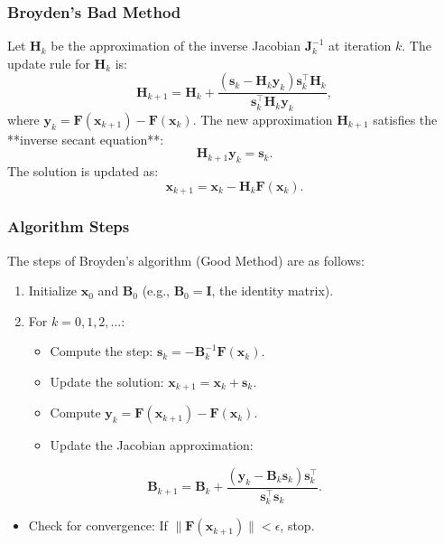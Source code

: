 \documentclass{beamer}
\begin{document}
\begin{frame}
\frametitle{Broyden’s Bad Method}

Let \( \mathbf{H}_k \) be the approximation of the inverse Jacobian \( \mathbf{J}_k^{-1} \) at iteration \( k \). The update rule for \( \mathbf{H}_k \) is:
\[
\mathbf{H}_{k+1} = \mathbf{H}_k + \frac{(\mathbf{s}_k - \mathbf{H}_k \mathbf{y}_k) \mathbf{s}_k^\top \mathbf{H}_k}{\mathbf{s}_k^\top \mathbf{H}_k \mathbf{y}_k},
\]
where \( \mathbf{y}_k = \mathbf{F}(\mathbf{x}_{k+1}) - \mathbf{F}(\mathbf{x}_k) \). The new approximation \( \mathbf{H}_{k+1} \) satisfies the **inverse secant equation**:
\[
\mathbf{H}_{k+1} \mathbf{y}_k = \mathbf{s}_k.
\]
The solution is updated as:
\[
\mathbf{x}_{k+1} = \mathbf{x}_k - \mathbf{H}_k \mathbf{F}(\mathbf{x}_k).
\]
\end{frame}

\begin{frame}
\frametitle{Algorithm Steps}

The steps of Broyden’s algorithm (Good Method) are as follows:
\begin{enumerate}
\item Initialize \( \mathbf{x}_0 \) and \( \mathbf{B}_0 \) (e.g., \( \mathbf{B}_0 = \mathbf{I} \), the identity matrix).

\item For \( k = 0, 1, 2, \dots \):
\begin{itemize}

  \item Compute the step: \( \mathbf{s}_k = -\mathbf{B}_k^{-1} \mathbf{F}(\mathbf{x}_k) \).

  \item Update the solution: \( \mathbf{x}_{k+1} = \mathbf{x}_k + \mathbf{s}_k \).

  \item Compute \( \mathbf{y}_k = \mathbf{F}(\mathbf{x}_{k+1}) - \mathbf{F}(\mathbf{x}_k) \).

  \item Update the Jacobian approximation:
\end{itemize}

\noindent
\end{enumerate}

\noindent
       \[
       \mathbf{B}_{k+1} = \mathbf{B}_k + \frac{(\mathbf{y}_k - \mathbf{B}_k \mathbf{s}_k) \mathbf{s}_k^\top}{\mathbf{s}_k^\top \mathbf{s}_k}.
       \]
\begin{itemize}
  \item Check for convergence: If \( \|\mathbf{F}(\mathbf{x}_{k+1})\| < \epsilon \), stop.
\end{itemize}

\noindent
\end{frame}
\end{document}
